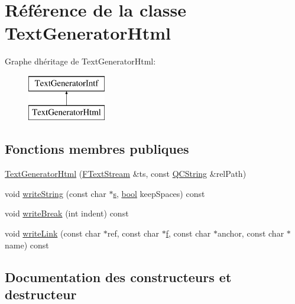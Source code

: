 \hypertarget{class_text_generator_html}{}\section{Référence de la classe Text\+Generator\+Html}
\label{class_text_generator_html}
Graphe d\textquotesingle{}héritage de Text\+Generator\+Html\+:\begin{figure}[H]
\begin{center}
\leavevmode
\includegraphics[height=2.000000cm]{class_text_generator_html}
\end{center}
\end{figure}
\subsection*{Fonctions membres publiques}
\begin{DoxyCompactItemize}
\item 
\hyperlink{class_text_generator_html_a08feef8d9e69ce18b91df9d7ec404dda}{Text\+Generator\+Html} (\hyperlink{class_f_text_stream}{F\+Text\+Stream} \&ts, const \hyperlink{class_q_c_string}{Q\+C\+String} \&rel\+Path)
\item 
void \hyperlink{class_text_generator_html_a74bd0f01ca5c670581a9056a25a8a9a4}{write\+String} (const char $\ast$\hyperlink{060__command__switch_8tcl_a011c73f2dbb87635a3b4206c72355f6e}{s}, \hyperlink{qglobal_8h_a1062901a7428fdd9c7f180f5e01ea056}{bool} keep\+Spaces) const 
\item 
void \hyperlink{class_text_generator_html_a097800ac4b8adab2380d2bd48adc3cc1}{write\+Break} (int indent) const 
\item 
void \hyperlink{class_text_generator_html_a3163cfa6f8af1ac710f4fb5b32629fe9}{write\+Link} (const char $\ast$ref, const char $\ast$\hyperlink{060__command__switch_8tcl_af6830d2c644b45088ea8f1f74a46b778}{f}, const char $\ast$anchor, const char $\ast$name) const 
\end{DoxyCompactItemize}


\subsection{Documentation des constructeurs et destructeur}
\hypertarget{class_text_generator_html_a08feef8d9e69ce18b91df9d7ec404dda}{}
